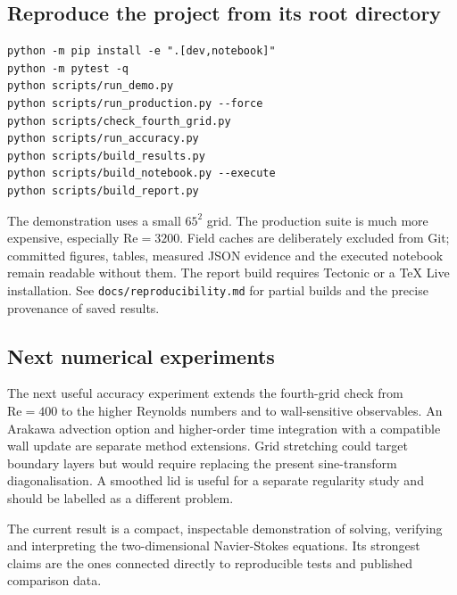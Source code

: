 \documentclass[11pt,a4paper]{article}
\newcommand{\Rey}{\mathrm{Re}}
\newcommand{\code}[1]{\texttt{#1}}
\begin{document}
\subsection{Reproduce the project from its root directory}
\begin{verbatim}
python -m pip install -e ".[dev,notebook]"
python -m pytest -q
python scripts/run_demo.py
python scripts/run_production.py --force
python scripts/check_fourth_grid.py
python scripts/run_accuracy.py
python scripts/build_results.py
python scripts/build_notebook.py --execute
python scripts/build_report.py
\end{verbatim}
The demonstration uses a small $65^2$ grid. The production suite is much more
expensive, especially $\Rey=3200$. Field caches are deliberately excluded from
Git; committed figures, tables, measured JSON evidence and the executed
notebook remain readable without them. The report build requires Tectonic or
a TeX Live installation. See \code{docs/reproducibility.md} for partial builds
and the precise provenance of saved results.

\subsection{Next numerical experiments}
The next useful accuracy experiment extends the fourth-grid check from
$\Rey=400$ to the higher Reynolds numbers and to wall-sensitive observables.
An Arakawa advection option and higher-order time integration with a compatible
wall update are separate method extensions. Grid stretching could target boundary layers but would require
replacing the present sine-transform diagonalisation. A smoothed lid is useful
for a separate regularity study and should be labelled as a different problem.

The current result is a compact, inspectable demonstration of solving,
verifying and interpreting the two-dimensional Navier-Stokes equations.
Its strongest claims are the ones connected directly to reproducible tests
and published comparison data.
\end{document}
